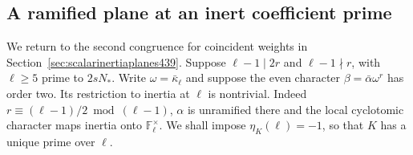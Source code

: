 \documentclass[a4paper,11pt]{article}
\theoremstyle{definition}
\theoremstyle{remark}
\numberwithin{equation}{section}
\begin{document}
\subsection{A ramified plane at an inert coefficient prime}
\label{sec:inertquadraticplane443}

We return to the second congruence for coincident weights in
Section~\ref{sec:scalarinertiaplanes439}. Suppose
\(\ell-1\mid 2r\) and \(\ell-1\nmid r\), with \(\ell\ge5\)
prime to \(2sN_*\). Write \(\omega=\bar\kappa_\ell\) and suppose
the even character \(\beta=\bar\alpha\omega^r\) has order two.
Its restriction to inertia at \(\ell\) is nontrivial. Indeed
\(r\equiv(\ell-1)/2\bmod(\ell-1)\), \(\alpha\) is unramified there
and the local cyclotomic character maps inertia onto
\(\mathbb F_\ell^\times\). We shall impose \(\eta_K(\ell)=-1\),
so that \(K\) has a unique prime over \(\ell\).
\end{document}
